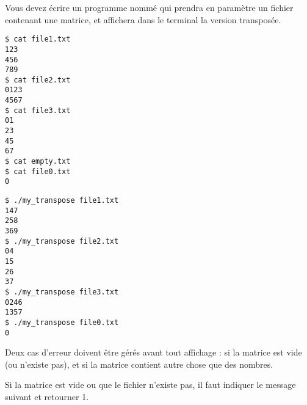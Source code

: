 

\vspace*{0.7cm}

\noindent {}

\bigskip


\noindent Vous devez écrire un programme nommé  qui prendra en paramètre un fichier contenant une matrice, et affichera dans le terminal la version transposée.



\smallskip

\lstset{language=sh}
\begin{lstlisting}[frame=single,title={Exemples de fichiers d'entrée}]
$ cat file1.txt
123
456
789
$ cat file2.txt
0123
4567
$ cat file3.txt
01
23
45
67
$ cat empty.txt
$ cat file0.txt
0
\end{lstlisting}



\smallskip

\lstset{language=sh}
\begin{lstlisting}[frame=single,title={Cas général}]
$ ./my_transpose file1.txt
147
258
369
$ ./my_transpose file2.txt
04
15
26
37
$ ./my_transpose file3.txt
0246
1357
$ ./my_transpose file0.txt
0
\end{lstlisting}

\bigskip

\noindent Deux cas d'erreur doivent être gérés avant tout affichage : si la matrice est vide (ou n'existe pas), et si la matrice contient autre chose que des nombres.

\noindent Si la matrice est vide ou que le fichier n'existe pas, il faut indiquer le message suivant et retourner 1.

\bigskip

\noindent {}

\bigskip

